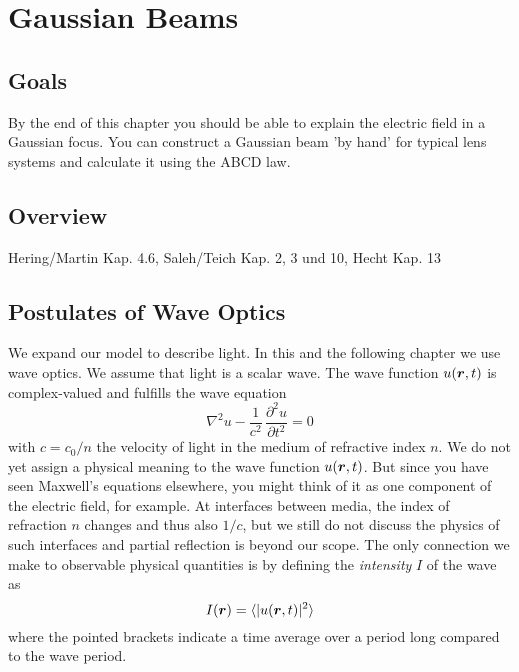 \renewcommand{\lastmod}{September 18, 2023}
\renewcommand{\chapterauthors}{Markus Lippitz}

\chapter{Gaussian Beams}


\section{Goals}

By the end of this chapter you should be able to explain the electric field in a Gaussian focus.
You can construct a Gaussian beam 'by hand' for typical lens systems and calculate it using the ABCD law.


\section{Overview}

Hering/Martin Kap. 4.6, Saleh/Teich Kap. 2,  3 und 10, Hecht Kap. 13



\section{Postulates of Wave Optics}

We expand our model to describe light. In this and the following chapter we use wave optics. We assume that light is a scalar wave. The wave function $u(\boldsymbol{r}, t)$ is complex-valued and fulfills the wave equation
\begin{equation}
    \nabla^2 u - \frac{1}{c^2} \, \frac{\partial^2 u}{\partial t^2} = 0
\end{equation}
with $c = c_0 /n$ the velocity of light in the medium of refractive index $n$. 
We do not yet assign a physical meaning to the wave function $u(\boldsymbol{r}, t)$. But since you have seen Maxwell's equations elsewhere, you might think of it as one component of the electric field, for example. At interfaces between media, the index of refraction $n$ changes and thus also $1/c$, but we still do not discuss the physics of such interfaces and partial reflection is beyond our scope.
The only connection we make to observable physical quantities is by defining the  \emph{intensity} $I$ of the wave as
\begin{equation}
    I(\boldsymbol{r}) = \braket{ |u(\boldsymbol{r}, t) |^2 }
\end{equation}
where the pointed brackets indicate a time average over a period long compared to the wave period.

